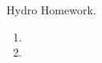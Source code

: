 \documentclass[12pt,preprint]{aastex}  %
\begin{document}
Hydro Homework.

\begin{enumerate}
\item 
\item 
\end{enumerate}
\end{document}
